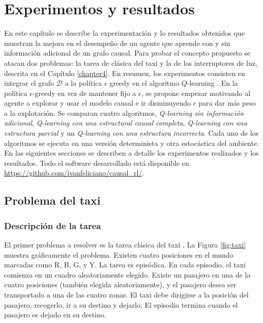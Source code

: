 \chapter{Experimentos y resultados}\label{chapter5}

\graphicspath{{Chapter5/Figs/}}


En este capítulo se describe la experimentación y lo resultados obtenidos
que muestran la mejora en el desempeño de un agente que aprende
con y sin información adicional de un grafo causal.
Para probar el concepto propuesto se atacan dos problemas: la tarea de clásica del taxi \cite{Dietterich:2000:HRL:1622262.1622268} y la de los
interruptores de luz, descrita en el Capítulo \ref{chapter4}.
En resumen, los experimentos consisten en integrar el grafo $\mathcal{D}$ a la política $\epsilon$ greedy
en el algoritmo $Q$-learning \cite{watkins1992q}.
En la política $\epsilon$-greedy en vez de mantener fijo a $\epsilon$, se propone empezar motivando al agente a explorar y usar
el modelo causal e ir disminuyendo $\epsilon$ para dar más peso a la explotación.
Se comparan cuatro algoritmos, \textit{Q-learning sin información
adicional}, \textit{Q-learning con una estructural causal completa}, \textit{Q-learning con una estructura parcial} y un \textit{Q-learning con una estructura incorrecta}.
Cada uno de los algoritmos se ejecuta en una versión determinista y 
otra estocástica del ambiente. 
En las siguientes secciones se describen a detalle los experimentos realizados y los resultados. Todo el software desarrollado está 
disponible en \url{https://github.com/ivanfeliciano/causal_rl/}.


\section{Problema del taxi}

\subsection{Descripción de la tarea}

El primer problema a resolver es la tarea clásica del taxi \cite{Dietterich:2000:HRL:1622262.1622268}.
La Figura \ref{fig:taxi} muestra gráficamente el problema.
Existen cuatro posiciones en el mundo marcadas como R, B, G, y Y. 
La tarea es episódica. En cada episodio, 
el taxi comienza en un cuadro aleatoriamente elegido. 
Existe un pasajero en una de la cuatro posiciones (también elegida
aleatoriamente), y el pasajero desea ser transportado a una de las
cuatro zonas.
El taxi debe dirigirse a la posición del pasajero, recogerlo, ir a su destino y dejarlo.
El episodio termina cuando el pasajero es dejado en su destino.

